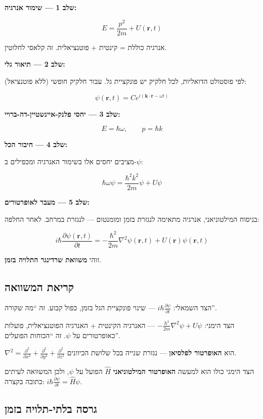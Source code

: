\documentclass[
  hebrew,
  letterpaper,
  DIV=11,
  numbers=noendperiod]{scrreprt}
\begin{document}
\textbf{שלב 1 --- שימור אנרגיה:}

\[E = \frac{p^2}{2m} + U(\mathbf{r}, t)\]

אנרגיה כוללת = קינטית + פוטנציאלית. זה קלאסי לחלוטין.

\textbf{שלב 2 --- תיאור גלי:}

לפי פוסטולט הדואליות, לכל חלקיק יש פונקציית גל. עבור חלקיק חופשי (ללא
פוטנציאל):

\[\psi(\mathbf{r},t) = C e^{i(\mathbf{k}\cdot\mathbf{r} - \omega t)}\]

\textbf{שלב 3 --- יחסי פלנק-איינשטיין-דה-ברויי:}

\[E = \hbar\omega, \qquad p = \hbar k\]

\textbf{שלב 4 --- חיבור הכל:}

מציבים יחסים אלו בשימור האנרגיה ומכפילים ב-\(\psi\):

\[\hbar\omega\psi = \frac{\hbar^2 k^2}{2m}\psi + U\psi\]

\textbf{שלב 5 --- מעבר לאופרטורים:}

בניסוח המילטוניאני, אנרגיה מתאימה לנגזרת בזמן ומומנטום --- לנגזרת במרחב.
לאחר החלפה:

\[\boxed{i\hbar\frac{\partial\psi(\mathbf{r},t)}{\partial t} = -\frac{\hbar^2}{2m}\nabla^2\psi(\mathbf{r},t) + U(\mathbf{r})\psi(\mathbf{r},t)}\]

זוהי \textbf{משוואת שרדינגר התלויה בזמן}.

\subsection{קריאת
המשוואה}\label{ux5e7ux5e8ux5d9ux5d0ux5ea-ux5d4ux5deux5e9ux5d5ux5d5ux5d0ux5d4}

הצד השמאלי: \(i\hbar\frac{\partial\psi}{\partial t}\) --- שינוי פונקציית
הגל בזמן, כפול קבוע. זה ``מה שקורה''.

הצד הימני: \(-\frac{\hbar^2}{2m}\nabla^2\psi + U\psi\) --- האנרגיה
הקינטית + האנרגיה הפוטנציאלית, פועלות כאופרטורים על \(\psi\). זה
``הכוחות הפועלים''.

\(\nabla^2 = \frac{\partial^2}{\partial x^2} + \frac{\partial^2}{\partial y^2} + \frac{\partial^2}{\partial z^2}\)
הוא \textbf{האופרטור לפלסיאן} --- נגזרת שנייה בכל שלושת הכיוונים.

הצד הימני כולו הוא למעשה \textbf{האופרטור המילטוניאני} \(\hat{H}\) הפועל
על \(\psi\), ולכן המשוואה לעיתים כתובה בקצרה:
\(i\hbar\frac{\partial\psi}{\partial t} = \hat{H}\psi\).

\subsection{גרסה בלתי-תלויה
בזמן}\label{ux5d2ux5e8ux5e1ux5d4-ux5d1ux5dcux5eaux5d9-ux5eaux5dcux5d5ux5d9ux5d4-ux5d1ux5d6ux5deux5df}
\end{document}
